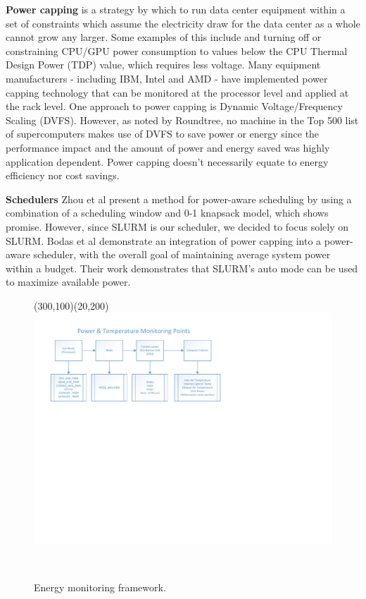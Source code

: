 \documentclass[letterpaper,twocolumn,10pt]{article}
\begin{document}
\textbf{Power capping} is a strategy by which to run data center equipment within a set of constraints which assume the electricity draw for the data center as a whole cannot grow any larger. Some examples of this include and turning off or constraining CPU/GPU power consumption to values below the CPU Thermal Design Power (TDP) value, which requires less voltage. Many equipment manufacturers - including IBM, Intel and AMD - have implemented power capping technology that can be monitored at the processor level and applied at the rack level. One approach to power capping is Dynamic Voltage/Frequency Scaling (DVFS). However, as noted by Roundtree\cite{Roundtree2012}, no machine in the Top 500 list of supercomputers makes use of DVFS to save power or energy since the performance impact and the amount of power and energy saved was highly application dependent. Power capping doesn’t necessarily equate to energy efficiency nor cost savings.

\textbf{Schedulers} Zhou et al\cite{Zhou2014} present a method for power-aware scheduling by using a combination of a scheduling window and 0-1 knapsack model, which shows promise. However, since SLURM is our scheduler, we decided to focus solely on SLURM. Bodas et al\cite{Bodas2014} demonstrate an integration of power capping into a power-aware scheduler, with the overall goal of maintaining average system power within a budget. Their work demonstrates that SLURM’s auto mode can be used to maximize available power.  

\begin{figure}[t]
	\begin{center}
		
				\begin{picture}(300,100)(20,200)
				\includegraphics[scale=0.50]{ray_fig}
				\end{picture}\\
	\end{center}
	\caption{Energy monitoring framework.}
	\label{ray_fig}
\end{figure}
\end{document}
